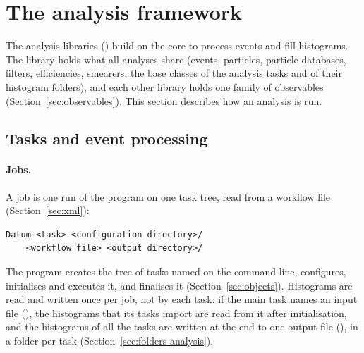 \section{The analysis framework}
\label{sec:analysis}

The analysis libraries () build on the core to process events and fill histograms. The
 library holds what all analyses share (events, particles, particle databases, filters,
efficiencies, smearers, the base classes of the analysis tasks and of their histogram folders), and each other library
holds one family of observables (Section~\ref{sec:observables}). This section describes how an analysis is run.

\subsection{Tasks and event processing}
\label{sec:tasks}

\paragraph{Jobs.}
A job is one run of the  program on one task tree, read from a workflow file (Section~\ref{sec:xml}):
{\footnotesize
\begin{verbatim}
Datum <task> <configuration directory>/
    <workflow file> <output directory>/
\end{verbatim}}
The program creates the tree of tasks named on the command line, configures, initialises and executes it, and
finalises it (Section~\ref{sec:objects}). Histograms are read and written once per job, not by each task: if the
main task names an input file (), the histograms that its tasks import are read from it after
initialisation, and the histograms of all the tasks are written at the end to one output file
(), in a folder per task (Section~\ref{sec:folders-analysis}).

